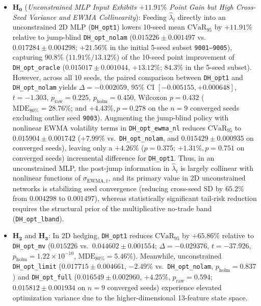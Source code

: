 \documentclass[11pt,a4paper]{article}
\begin{document}
\begin{enumerate}
\begin{itemize}
    \item $\mathbf{H_0}$ (\emph{Unconstrained MLP Input Exhibits $+11.91\%$ Point Gain but High Cross-Seed Variance and EWMA Collinearity}): Feeding $\hat{\lambda}_t$ directly into an unconstrained 2D MLP (\texttt{DH\_opt1}) lowers 10-seed mean $\text{CVaR}_{95}$ by $+11.91\%$ relative to jump-blind \texttt{DH\_opt\_nolam} ($0.015226 \pm 0.001497$ vs.\ $0.017284 \pm 0.004298$; $+21.56\%$ in the initial 5-seed subset \texttt{9001--9005}), capturing $90.8\%$ ($11.91\% / 13.12\%$) of the 10-seed point improvement of \texttt{DH\_opt\_oracle} ($0.015017 \pm 0.001044$, $+13.12\%$; $84.3\%$ in the 5-seed subset). However, across all 10 seeds, the paired comparison between \texttt{DH\_opt1} and \texttt{DH\_opt\_nolam} yields $\Delta = -0.002059$, $95\%$ CI $[-0.005155, +0.000648]$, $t = -1.303$, $p_{\text{raw}} = 0.225$, $p_{\text{holm}} = 0.450$, Wilcoxon $p = 0.432$ ($\text{MDE}_{80\%} = 28.76\%$; and $+4.43\%, p = 0.278$ on the $n = 9$ converged seeds excluding outlier seed \texttt{9003}). Augmenting the jump-blind policy with nonlinear EWMA volatility terms in \texttt{DH\_opt\_ewma\_nl} reduces $\text{CVaR}_{95}$ to $0.015904 \pm 0.001742$ ($+7.99\%$ vs.\ \texttt{DH\_opt\_nolam}, and $0.015429 \pm 0.000935$ on converged seeds), leaving only a $+4.26\%$ ($p = 0.375$; $+1.31\%, p = 0.751$ on converged seeds) incremental difference for \texttt{DH\_opt1}. Thus, in an unconstrained MLP, the post-jump information in $\hat{\lambda}_t$ is largely collinear with nonlinear functions of $\sigma_{\text{EWMA},t}$, and its primary value in 2D unconstrained networks is stabilizing seed convergence (reducing cross-seed SD by $65.2\%$ from $0.004298$ to $0.001497$), whereas statistically significant tail-risk reduction requires the structural prior of the multiplicative no-trade band (\texttt{DH\_opt\_lband}).
    \item $\mathbf{H_2}$ and $\mathbf{H_3}$: In 2D hedging, \texttt{DH\_opt1} reduces $\text{CVaR}_{95}$ by $+65.86\%$ relative to \texttt{DH\_opt\_mv} ($0.015226$ vs.\ $0.044602 \pm 0.001554$; $\Delta = -0.029376$, $t = -37.926$, $p_{\text{holm}} = 1.22 \times 10^{-10}$, $\text{MDE}_{80\%} = 5.46\%$). Meanwhile, unconstrained \texttt{DH\_opt\_limit} ($0.017715 \pm 0.004661$, $-2.49\%$ vs.\ \texttt{DH\_opt\_nolam}, $p_{\text{holm}} = 0.837$) and \texttt{DH\_opt\_full} ($0.016549 \pm 0.002960$, $+4.25\%$, $p_{\text{raw}} = 0.594$; $0.015812 \pm 0.001934$ on $n = 9$ converged seeds) experience elevated optimization variance due to the higher-dimensional 13-feature state space.
  \end{itemize}

\end{enumerate}
\end{document}

